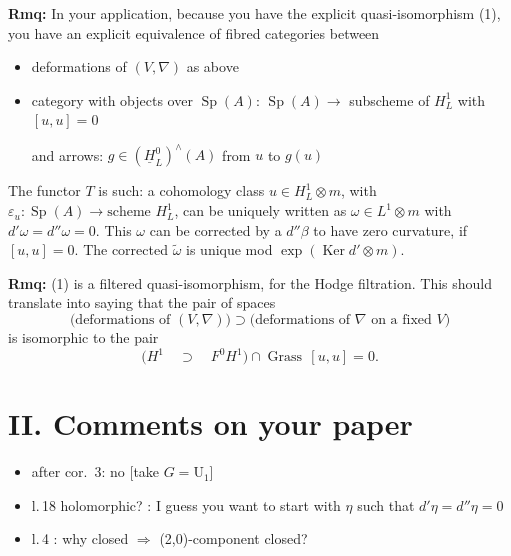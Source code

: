 \documentclass[11pt,a4paper]{article}
\DeclareMathOperator{\Sp}{Sp}
\DeclareMathOperator{\Ker}{Ker}
\DeclareMathOperator{\Grass}{Grass}
\begin{document}
\newpage

\noindent\textbf{Rmq:} In your application, because you have the explicit quasi-isomorphism (1), you have an explicit equivalence of fibred categories between
\begin{itemize}[leftmargin=2cm]
\item[$*$] deformations of $(V,\nabla)$ as above
\item[$*$] category with objects over $\Sp(A)$: $\Sp(A) \longrightarrow$ subscheme of $H^1_L$ with $[u,u]=0$

and arrows: $g \in (\underline{H}^0_L)^\wedge(A)$ from $u$ to $g(u)$
\end{itemize}

\vspace{0.3cm}

The functor $T$ is such: a cohomology class $u \in H^1_L \otimes m$, with $\varepsilon_u\colon \Sp(A) \to \text{scheme } H^1_L$, can be uniquely written as $\omega \in L^1 \otimes m$ with $d'\omega = d''\omega = 0$. This $\omega$ can be corrected by a $d''\beta$ to have zero curvature, if $[u,u]=0$. The corrected $\tilde{\omega}$ is unique mod $\exp(\Ker d' \otimes m)$.

\vspace{0.3cm}

\noindent\textbf{Rmq:} (1) is a filtered quasi-isomorphism, for the Hodge filtration. This should translate into saying that the pair of spaces
\[
\bigl(\text{deformations of }(V,\nabla)\bigr) \supset \bigl(\text{deformations of }\nabla\text{ on a fixed }V\bigr)
\]
is isomorphic to the pair
\[
\bigl(H^1 \quad\supset\quad F^0 H^1\bigr) \cap \Grass\,[u,u]=0.
\]

\newpage

\section*{II. Comments on your paper}

\begin{itemize}[leftmargin=0.5cm]
\item[$p\,2$] after cor.\ 3: no [take $G = \mathrm{U}_1$]
\item[$p\,6$] l.\,18 holomorphic? : I guess you want to start with $\eta$ such that $d'\eta = d''\eta = 0$
\item[$p\,7$] l.\,4 : why closed $\Rightarrow$ (2,0)-component closed?
\end{itemize}

\vspace{0.5cm}
\end{document}
